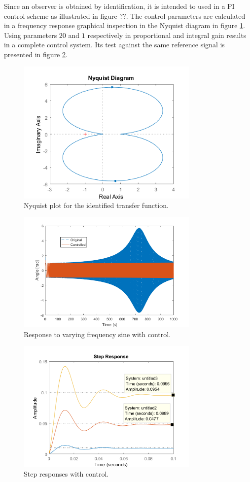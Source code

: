 \documentclass[journal]{IEEEtran}
\begin{document}
Since an observer is obtained by identification, it is intended to used in a PI control scheme as illustrated in figure ??. The control parameters are calculated in a frequency response graphical inspection in the Nyquist diagram in figure \ref{fig:nyquist}. Using parameters $20$ and $1$ respectively in proportional and integral gain results in a complete control system. Its test against the same reference signal is presented in figure \ref{fig:controlled_chirp_response}.

\begin{figure}[!t]
\centering
\includegraphics[width=3.5in]{nyquist_microscope.png}
\caption{Nyquist plot for the identified transfer function.}
\label{fig:nyquist}
\end{figure}

\begin{figure}[!t]
\centering
\includegraphics[width=3.5in]{controlled_chirp_response.png}
\caption{Response to varying frequency sine with control.}
\label{fig:controlled_chirp_response}
\end{figure}

\begin{figure}[!t]
\centering
\includegraphics[width=3.5in]{step_response.png}
\caption{Step responses with control.}
\label{fig:step_response}
\end{figure}
\end{document}
